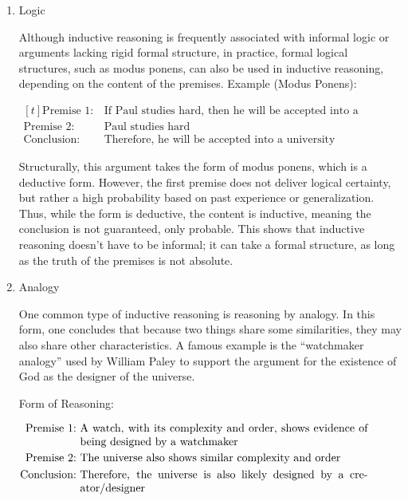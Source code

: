 \documentclass[12pt,a4paper,openany]{article}
\begin{document}
\begin{enumerate}
\def\labelenumi{\arabic{enumi}.}
\item Logic

Although inductive reasoning is frequently associated with informal
logic or arguments lacking rigid formal structure, in practice, formal
logical structures, such as modus ponens, can also be used in
inductive reasoning, depending on the content of the premises. Example
(Modus Ponens):

\noindent
\(
\begin{aligned}[t]
 \text{Premise 1:} \ & \text{If Paul studies hard, then he will be accepted into a university} \\
 \text{Premise 2:} \ & \text{Paul studies hard} \\
 \text{Conclusion:} \ & \text{Therefore, he will be accepted into a university}
\end{aligned}
\)

Structurally, this argument takes the form of modus ponens, which is a
deductive form. However, the first premise does not deliver logical
certainty, but rather a high probability based on past experience or
generalization. Thus, while the form is deductive, the content is
inductive, meaning the conclusion is not guaranteed, only probable.
This shows that inductive reasoning doesn't have to be informal; it
can take a formal structure, as long as the truth of the premises is
not absolute.

\item Analogy

One common type of inductive reasoning is reasoning by analogy. In
this form, one concludes that because two things share some
similarities, they may also share other characteristics. A famous
example is the ``watchmaker analogy'' used by William Paley to support
the argument for the existence of God as the designer of the universe.

Form of Reasoning:

\noindent
\(
\begin{aligned}[t]
 \text{Premise 1:} \ & \parbox[t]{0.75\textwidth}{A watch, with its complexity and order, shows evidence of being designed by a watchmaker} \\
 \text{Premise 2:} \ & \parbox[t]{0.75\textwidth}{The universe also shows similar complexity and order} \\
 \text{Conclusion:} \ & \parbox[t]{0.75\textwidth}{Therefore, the universe is also likely designed by a creator/designer}
\end{aligned}
\)



\end{enumerate}
\end{document}

